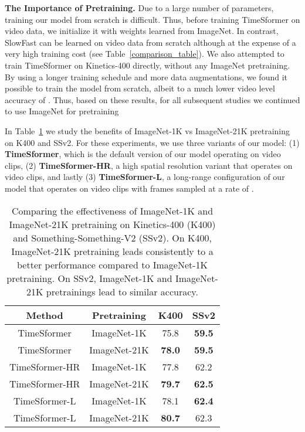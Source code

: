 \documentclass{article}
\begin{document}
\textbf{The Importance of Pretraining.} Due to a large number of parameters, training our model from scratch is difficult. Thus, before training TimeSformer on video data, we initialize it with weights learned from ImageNet. In contrast, SlowFast can be learned on video data from scratch although at the expense of a very high training cost  (see Table~\ref{comparison_table}). We also attempted to train TimeSformer on Kinetics-400 directly, without any ImageNet pretraining. By using a longer training schedule and more data augmentations, we found it possible to train the model from scratch, albeit to a much lower video level accuracy of . Thus, based on these results, for all subsequent studies we continued to use ImageNet for pretraining~\cite{5206848}

In Table~\ref{pretraining_results_table} we study the benefits of ImageNet-1K vs ImageNet-21K pretraining on K400 and SSv2. For these experiments, we use three variants of our model: (1) \textbf{TimeSformer}, which is the default version of our model operating on  video clips, (2) \textbf{TimeSformer-HR}, a high spatial resolution variant that operates on  video clips, and lastly (3) \textbf{TimeSformer-L}, a long-range configuration of our model that operates on   video clips with frames sampled at a rate of .

 
 \begin{table}
\centering
{\scriptsize
 \begin{tabular}{c c c c }
 \hline
{Method} & {Pretraining} & {K400} & {SSv2} \\ 
 \hline
TimeSformer & ImageNet-1K & 75.8  & \bf 59.5 \\
TimeSformer & ImageNet-21K & \bf 78.0  & \bf 59.5 \\ \hline
TimeSformer-HR & ImageNet-1K  & 77.8  &  62.2 \\
TimeSformer-HR & ImageNet-21K  & \bf 79.7  & \bf 62.5 \\ \hline
TimeSformer-L & ImageNet-1K & 78.1 & \bf 62.4\\ 
TimeSformer-L & ImageNet-21K & \bf 80.7 & 62.3\\ 
 \hline
 \end{tabular}
 }
  \vspace{-0.1cm}
\caption{Comparing the effectiveness of ImageNet-1K and ImageNet-21K pretraining on Kinetics-400 (K400) and Something-Something-V2 (SSv2). On K400, ImageNet-21K pretraining leads consistently to a better performance compared to ImageNet-1K pretraining. On SSv2, ImageNet-1K and ImageNet-21K pretrainings lead to similar accuracy.\vspace{-0.3cm}}
\label{pretraining_results_table}
 \end{table}
\end{document}
